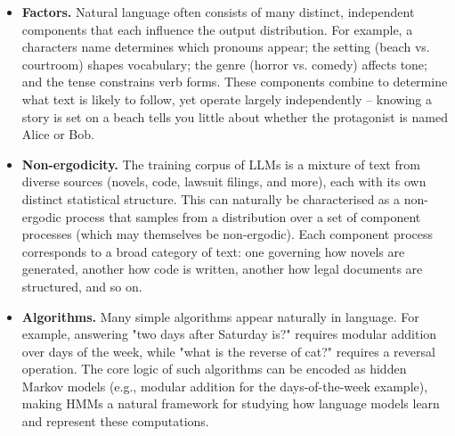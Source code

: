 \begin{itemize}
\item
  \textbf{Factors.} Natural language often consists of many distinct, independent components that each influence the output distribution. For example, a character\textquotesingle s name determines which pronouns appear; the setting (beach vs. courtroom) shapes vocabulary; the genre (horror vs. comedy) affects tone; and the tense constrains verb forms. These components combine to determine what text is likely to follow, yet operate largely independently -- knowing a story is set on a beach tells you little about whether the protagonist is named Alice or Bob.
\item
  \textbf{Non-ergodicity.} The training corpus of LLMs is a mixture of text from diverse sources (novels, code, lawsuit filings, and more), each with its own distinct statistical structure. This can naturally be characterised as a non-ergodic process that samples from a distribution over a set of component processes (which may themselves be non-ergodic). Each component process corresponds to a broad category of text: one governing how novels are generated, another how code is written, another how legal documents are structured, and so on.
\item
  \textbf{Algorithms.} Many simple algorithms appear naturally in language. For example, answering "two days after Saturday is?" requires modular addition over days of the week, while "what is the reverse of \textquotesingle cat\textquotesingle?" requires a reversal operation. The core logic of such algorithms can be encoded as hidden Markov models (e.g., modular addition for the days-of-the-week example), making HMMs a natural framework for studying how language models learn and represent these computations.
\end{itemize}
